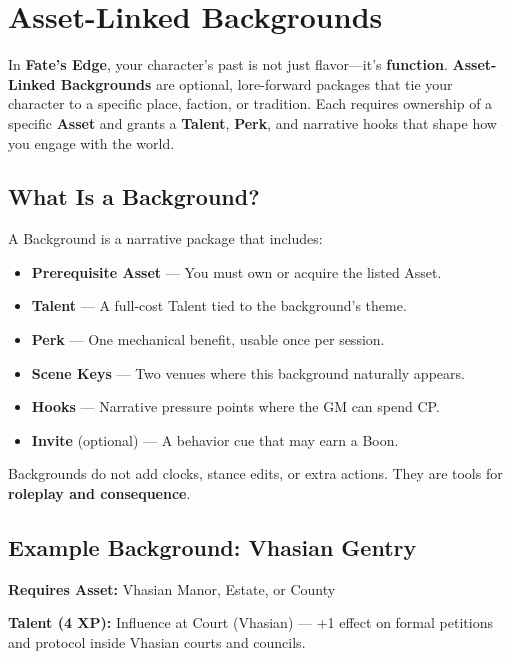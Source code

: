 
\chapter{Asset-Linked Backgrounds}
\label{ch:backgrounds}

In \textbf{Fate's Edge}, your character's past is not just flavor—it's \textbf{function}. \textbf{Asset-Linked Backgrounds} are optional, lore-forward packages that tie your character to a specific place, faction, or tradition. Each requires ownership of a specific \textbf{Asset} and grants a \textbf{Talent}, \textbf{Perk}, and narrative hooks that shape how you engage with the world.

\section{What Is a Background?}

A Background is a narrative package that includes:

\begin{itemize}
  \item \textbf{Prerequisite Asset} — You must own or acquire the listed Asset.
  \item \textbf{Talent} — A full-cost Talent tied to the background's theme.
  \item \textbf{Perk} — One mechanical benefit, usable once per session.
  \item \textbf{Scene Keys} — Two venues where this background naturally appears.
  \item \textbf{Hooks} — Narrative pressure points where the GM can spend CP.
  \item \textbf{Invite} (optional) — A behavior cue that may earn a Boon.
\end{itemize}

Backgrounds do not add clocks, stance edits, or extra actions. They are tools for \textbf{roleplay and consequence}.

\section{Example Background: Vhasian Gentry}

\textbf{Requires Asset:} Vhasian Manor, Estate, or County

\textbf{Talent (4 XP):} Influence at Court (Vhasian) — +1 effect on formal petitions and protocol inside Vhasian courts and councils.

